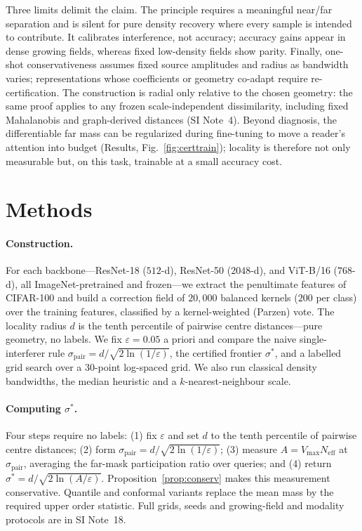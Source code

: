 \documentclass[10pt,twocolumn]{article}
\newcommand{\sstar}{\sigma^{*}}
\newcommand{\Neff}{N_{\mathrm{eff}}}
\begin{document}
Three limits delimit the claim. The principle requires a meaningful near/far separation and is silent for pure density recovery where every sample is intended to contribute. It calibrates interference, not accuracy; accuracy gains appear in dense growing fields, whereas fixed low-density fields show parity. Finally, one-shot conservativeness assumes fixed source amplitudes and radius as bandwidth varies; representations whose coefficients or geometry co-adapt require re-certification. The construction is radial only relative to the chosen geometry: the same proof applies to any frozen scale-independent dissimilarity, including fixed Mahalanobis and graph-derived distances (SI Note~4). Beyond diagnosis, the differentiable far mass can be regularized during fine-tuning to move a reader's attention into budget (Results, Fig.~\ref{fig:certtrain}); locality is therefore not only measurable but, on this task, trainable at a small accuracy cost.

\section{Methods}

\paragraph{Construction.} For each backbone---ResNet-18 ($512$-d), ResNet-50 ($2048$-d), and ViT-B/16 ($768$-d), all ImageNet-pretrained and frozen---we extract the penultimate features of CIFAR-100 and build a correction field of $20{,}000$ balanced kernels ($200$ per class) over the training features, classified by a kernel-weighted (Parzen) vote. The locality radius $d$ is the tenth percentile of pairwise centre distances---pure geometry, no labels. We fix $\varepsilon=0.05$ a priori and compare the naive single-interferer rule $\sigma_{\mathrm{pair}}=d/\sqrt{2\ln(1/\varepsilon)}$, the certified frontier $\sstar$, and a labelled grid search over a $30$-point log-spaced grid. We also run classical density bandwidths, the median heuristic and a $k$-nearest-neighbour scale.

\paragraph{Computing $\sstar$.} Four steps require no labels: (1) fix $\varepsilon$ and set $d$ to the tenth percentile of pairwise centre distances; (2) form $\sigma_{\mathrm{pair}}=d/\sqrt{2\ln(1/\varepsilon)}$; (3) measure $A=V_{\max}\Neff$ at $\sigma_{\mathrm{pair}}$, averaging the far-mask participation ratio over queries; and (4) return $\sstar=d/\sqrt{2\ln(A/\varepsilon)}$. Proposition~\ref{prop:conserv} makes this measurement conservative. Quantile and conformal variants replace the mean mass by the required upper order statistic. Full grids, seeds and growing-field and modality protocols are in SI Note~18.
\end{document}
